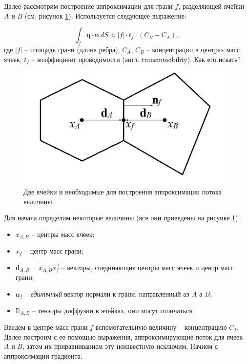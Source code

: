 \documentclass[a4paper, 11pt]{article}
\begin{document}
Далее рассмотрим построение аппроксимации для грани $f$, разделяющей ячейки $A$ и $B$ (см. рисунок \ref{pic:tpfa}). Используется следующее выражение:

\begin{equation}\label{eq:tpfa_idea}
\int_{f}\mathbf{q}\cdot\mathbf{n} ~dS
\approx
|f|\cdot t_f \cdot (C_B - C_A),
\end{equation}
где $|f|$ -- площадь грани (длина ребра), $C_A$, $C_B$ -- концентрации в центрах масс ячеек, $t_f$ -- коэффициент проводимости (англ. transmissibility). Как его искать?

\begin{figure}[h] \centering
	\includegraphics[scale=0.4]{fvm_tpfa}
	\caption{Две ячейки и необходимые для построения аппроксимации потока величины\label{pic:tpfa}}
\end{figure}

Для начала определим некоторые величины (все они приведены на рисунке \ref{pic:tpfa}):
\begin{itemize}
	\item $x_{A,B}$ -- центры масс ячеек;
	\item $x_f$ -- центр масс грани;
	\item $\mathbf{d}_{A,B} = \overrightarrow{x_{A,B}x_f}$ -- векторы, соединяющие центры масс ячеек и центр масс грани;
	\item $\mathbf{n}_f$ -- \textit{единичный} вектор нормали к грани, направленный \textit{из $A$ в $B$};
	\item $\mathbb{D}_{A,B}$ -- тензоры диффузии в ячейках, они могут отличаться.
\end{itemize}

Введем в центре масс грани $f$ вспомогательную величину -- концентрацию $C_f$. Далее построим с ее помощью выражения, аппроксимирующие поток для ячеек $A$ и $B$, затем их приравниванием эту неизвестную исключим. Начнем с аппроксимации градиента:
\end{document}
